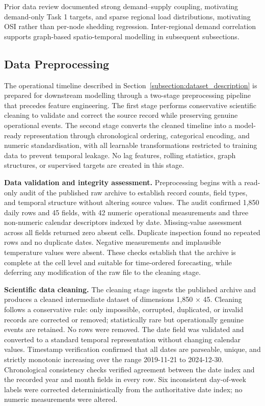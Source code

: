 Prior data review documented strong demand--supply coupling, motivating demand-only Task 1 targets, and sparse regional load distributions, motivating OSI rather than per-node shedding regression. Inter-regional demand correlation supports graph-based spatio-temporal modelling in subsequent subsections.

\subsection{Data Preprocessing}\label{subsection:data_preprocessing}

The operational timeline described in Section~\ref{subsection:dataset_description} is prepared for downstream modelling through a two-stage preprocessing pipeline that precedes feature engineering. The first stage performs conservative scientific cleaning to validate and correct the source record while preserving genuine operational events. The second stage converts the cleaned timeline into a model-ready representation through chronological ordering, categorical encoding, and numeric standardisation, with all learnable transformations restricted to training data to prevent temporal leakage. No lag features, rolling statistics, graph structures, or supervised targets are created in this stage.

\textbf{Data validation and integrity assessment.} Preprocessing begins with a read-only audit of the published raw archive to establish record counts, field types, and temporal structure without altering source values. The audit confirmed 1,850 daily rows and 45 fields, with 42 numeric operational measurements and three non-numeric calendar descriptors indexed by date. Missing-value assessment across all fields returned zero absent cells. Duplicate inspection found no repeated rows and no duplicate dates. Negative measurements and implausible temperature values were absent. These checks establish that the archive is complete at the cell level and suitable for time-ordered forecasting, while deferring any modification of the raw file to the cleaning stage.

\textbf{Scientific data cleaning.} The cleaning stage ingests the published archive and produces a cleaned intermediate dataset of dimensions 1,850 $\times$ 45. Cleaning follows a conservative rule: only impossible, corrupted, duplicated, or invalid records are corrected or removed; statistically rare but operationally genuine events are retained. No rows were removed. The date field was validated and converted to a standard temporal representation without changing calendar values. Timestamp verification confirmed that all dates are parseable, unique, and strictly monotonic increasing over the range 2019-11-21 to 2024-12-30. Chronological consistency checks verified agreement between the date index and the recorded year and month fields in every row. Six inconsistent day-of-week labels were corrected deterministically from the authoritative date index; no numeric measurements were altered.

